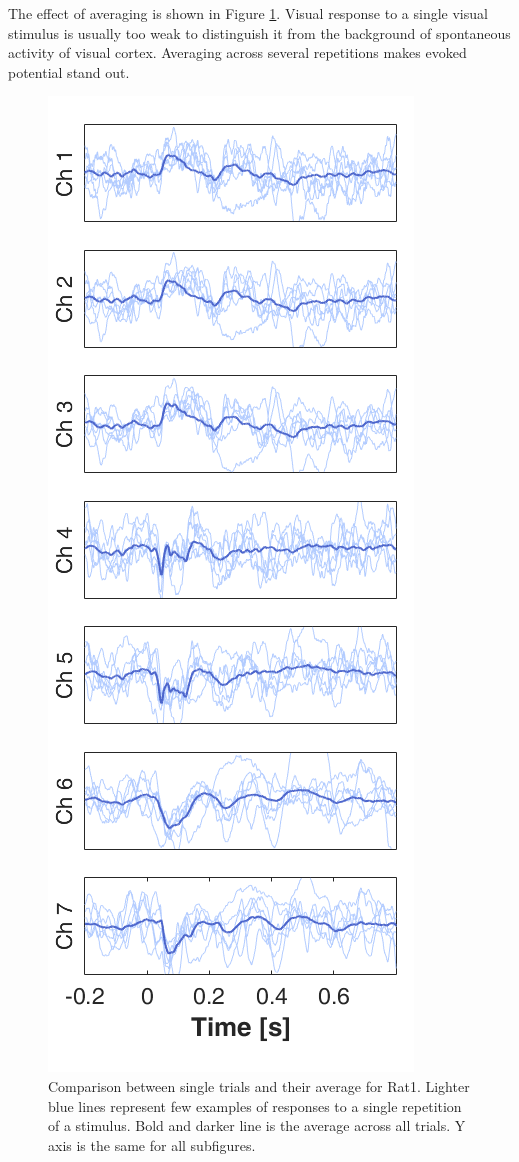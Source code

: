 \documentclass{pracalicmgr}
\begin{document}
   The effect of averaging is shown in Figure \ref{rys:usrednianie}. Visual response to a single visual stimulus is usually too weak to distinguish it from the background of spontaneous activity of visual cortex. Averaging across several repetitions makes evoked potential stand out.
   \begin{figure}[H]
   	\begin{center}
   		\includegraphics[scale=0.5]{usrednianie3.png}
   	\end{center}
   	\caption{ Comparison between single trials and their average for Rat1. Lighter blue lines represent few examples of responses to a single repetition of a stimulus. Bold and darker line is the average across all trials. Y axis is the same for all subfigures. }
   	\label{rys:usrednianie}
   \end{figure} 
   
\end{document}
